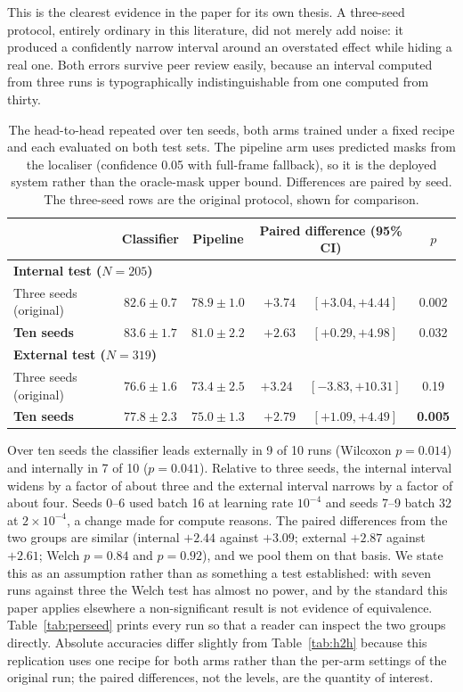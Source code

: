 \documentclass{melba}
\begin{document}
This is the clearest evidence in the paper for its own thesis. A three-seed protocol, entirely ordinary in this literature, did not merely add noise: it produced a confidently narrow interval around an overstated effect while hiding a real one. Both errors survive peer review easily, because an interval computed from three runs is typographically indistinguishable from one computed from thirty.

\begin{table}[t]
\centering
\caption{The head-to-head repeated over ten seeds, both arms trained under a fixed recipe and each evaluated on both test sets. The pipeline arm uses predicted masks from the localiser (confidence 0.05 with full-frame fallback), so it is the deployed system rather than the oracle-mask upper bound. Differences are paired by seed. The three-seed rows are the original protocol, shown for comparison.}
\small
\begin{tabular}{|l|c|c|c|c|}
\hline
 & Classifier & Pipeline & Paired difference (95\% CI) & $p$ \\
\hline
\multicolumn{5}{|l|}{\textbf{Internal test ($N=205$)}} \\
\hline
Three seeds (original) & $82.6 \pm 0.7$ & $78.9 \pm 1.0$ & $+3.74$ \ \ $[+3.04, +4.44]$ & 0.002 \\
\textbf{Ten seeds} & $83.6 \pm 1.7$ & $81.0 \pm 2.2$ & $\mathbf{+2.63}$ \ \ $\mathbf{[+0.29, +4.98]}$ & 0.032 \\
\hline
\multicolumn{5}{|l|}{\textbf{External test ($N=319$)}} \\
\hline
Three seeds (original) & $76.6 \pm 1.6$ & $73.4 \pm 2.5$ & $+3.24$ \ \ $[-3.83, +10.31]$ & 0.19 \\
\textbf{Ten seeds} & $77.8 \pm 2.3$ & $75.0 \pm 1.3$ & $\mathbf{+2.79}$ \ \ $\mathbf{[+1.09, +4.49]}$ & \textbf{0.005} \\
\hline
\end{tabular}

\vspace{2mm}
\parbox{0.95\textwidth}{\footnotesize Over ten seeds the classifier leads externally in 9 of 10 runs (Wilcoxon $p=0.014$) and internally in 7 of 10 ($p=0.041$). Relative to three seeds, the internal interval widens by a factor of about three and the external interval narrows by a factor of about four. Seeds 0--6 used batch 16 at learning rate $10^{-4}$ and seeds 7--9 batch 32 at $2\times10^{-4}$, a change made for compute reasons. The paired differences from the two groups are similar (internal $+2.44$ against $+3.09$; external $+2.87$ against $+2.61$; Welch $p=0.84$ and $p=0.92$), and we pool them on that basis. We state this as an assumption rather than as something a test established: with seven runs against three the Welch test has almost no power, and by the standard this paper applies elsewhere a non-significant result is not evidence of equivalence. Table~\ref{tab:perseed} prints every run so that a reader can inspect the two groups directly. Absolute accuracies differ slightly from Table~\ref{tab:h2h} because this replication uses one recipe for both arms rather than the per-arm settings of the original run; the paired differences, not the levels, are the quantity of interest.}
\label{tab:paired}
\end{table}
\end{document}
